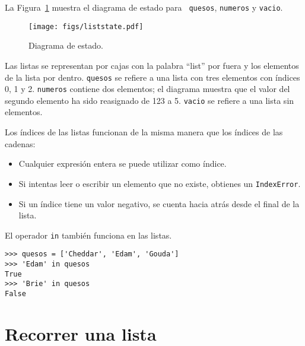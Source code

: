 \documentclass[10pt]{book}
\begin{document}
La Figura~\ref{fig.liststate} muestra
el diagrama de estado para {\tt
quesos}, {\tt numeros} y {\tt vacio}.

\begin{figure}
\centerline
{\texttt{[image: figs/liststate.pdf]}}
\caption{Diagrama de estado.}
\label{fig.liststate}
\end{figure}

Las listas se representan por cajas con la palabra ``list'' por fuera
y los elementos de la lista por dentro.  {\tt quesos} se refiere a
una lista con tres elementos con índices 0, 1 y 2.
{\tt numeros} contiene dos elementos; el diagrama muestra que el
valor del segundo elemento ha sido reasignado de 123 a 5.
{\tt vacio} se refiere a una lista sin elementos.

Los índices de las listas funcionan de la misma manera que los índices de las cadenas:

\begin{itemize}

\item Cualquier expresión entera se puede utilizar como índice.

\item Si intentas leer o escribir un elemento que no existe,
obtienes un {\tt IndexError}.

\item Si un índice tiene un valor negativo, se cuenta hacia atrás desde el
final de la lista.

\end{itemize}


El operador {\tt in} también funciona en las listas.

\begin{verbatim}
>>> quesos = ['Cheddar', 'Edam', 'Gouda']
>>> 'Edam' in quesos
True
>>> 'Brie' in quesos
False
\end{verbatim}


\section{Recorrer una lista}
\end{document}
